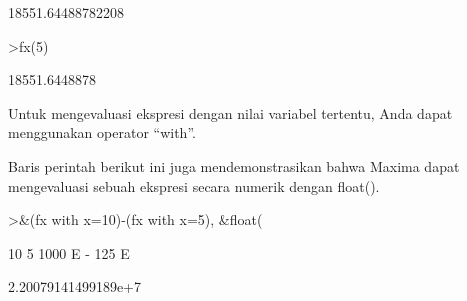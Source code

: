 \documentclass[a4paper,10pt]{article}
\begin{document}
\begin{eulernotebook}
\begin{eulercomment}
\begin{eulercomment}
\begin{eulercomment}
\begin{eulercomment}
\begin{euleroutput}
                            18551.64488782208
  
\end{euleroutput}
\begin{eulerprompt}
>fx(5)
\end{eulerprompt}
\begin{euleroutput}
  18551.6448878
\end{euleroutput}
\begin{eulercomment}
Untuk mengevaluasi ekspresi dengan nilai variabel tertentu, Anda dapat
menggunakan operator “with”.


Baris perintah berikut ini juga mendemonstrasikan bahwa Maxima dapat
mengevaluasi sebuah ekspresi secara numerik dengan float().
\end{eulercomment}
\begin{eulerprompt}
>&(fx with x=10)-(fx with x=5), &float(%
\end{eulerprompt}
\begin{euleroutput}
  
                                  10        5
                            1000 E   - 125 E
  
  
                           2.20079141499189e+7
  

\end{euleroutput}
\end{eulercomment}
\end{eulercomment}
\end{eulercomment}
\end{eulercomment}
\end{eulernotebook}
\end{document}
